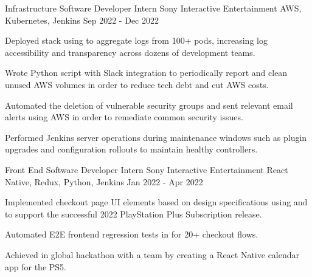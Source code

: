 

\begin{cventries}

  \cventry
    {Infrastructure Software Developer Intern} %
    {Sony Interactive Entertainment} %
    {AWS, Kubernetes, Jenkins} %
    {Sep 2022 - Dec 2022} %
    {
      \begin{cvitems} %
        \item {Deployed  stack using  to aggregate logs from 100+  pods, increasing log accessibility and transparency across dozens of development teams.}
        \item {Wrote Python script with Slack integration to periodically report and clean unused AWS volumes in order to reduce tech debt and cut AWS costs.}
        \item {Automated the deletion of vulnerable security groups and sent relevant email alerts using AWS  in order to remediate common security issues.}
        \item {Performed  Jenkins server operations during maintenance windows such as plugin upgrades and configuration rollouts to maintain healthy controllers.}
      \end{cvitems}
    }

  \cventry
    {Front End Software Developer Intern} %
    {Sony Interactive Entertainment} %
    {React Native, Redux, Python, Jenkins} %
    {Jan 2022 - Apr 2022} %
    {
      \begin{cvitems} %
        \item {Implemented checkout page UI elements based on design specifications using  and  to support the successful 2022 PlayStation Plus Subscription release.}
        \item {Automated E2E frontend regression tests in  for 20+ checkout flows.} 
        \item {Achieved  in global hackathon with a team by creating a React Native calendar app for the PS5.}
      \end{cvitems}
    }


\end{cventries}
